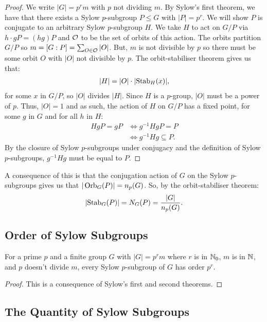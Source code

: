\begin{proof}
    We write $|G| = p^rm$ with $p$ not dividing $m$.
    By Sylow's first theorem, we have that there exists
    a Sylow $p$-subgroup $P \leq G$ with $|P| = p^r$.
    We will show $P$ is conjugate to an arbitrary Sylow
    $p$-subgroup $H$.
    We take $H$ to act on $G / P$ via $h \cdot gP = (hg)P$
    and $\mathcal{O}$ to be the set of orbits of this action.
    The orbits partition $G / P$ so 
    $m = [G : P] = \sum_{O \in \mathcal{O}} |O|$. But, $m$
    is not divisible by $p$ so there must be some orbit
    $O$ with $|O|$ not divisible by $p$.
    The orbit-stabiliser theorem gives us that: \begin{align*}
        |H| = |O| \cdot |\!\operatorname{Stab}_H(x)|,
    \end{align*} for some $x$ in $G / P$, so $|O|$ divides
    $|H|$. Since $H$ is a $p$-group, $|O|$ must be a power
    of $p$. Thus, $|O| = 1$ and as such, the action of $H$ on 
    $G / P$ has a fixed point, for some $g$ in $G$ and for 
    all $h$ in $H$: \begin{align*}
        HgP = gP
        & \Longleftrightarrow g^{-1}HgP = P \\
        & \Longleftrightarrow g^{-1}Hg \subseteq P.
    \end{align*} By the closure of Sylow $p$-subgroups under
    conjugacy and the definition of Sylow $p$-subgroups, 
    $g^{-1}Hg$ must be equal to $P$.
\end{proof}
\noindent
A consequence of this is that the conjugation action of $G$
on the Sylow $p$-subgroups gives us that
$|\operatorname{Orb}_G(P)| = n_p(G)$. So, by the orbit-stabiliser
theorem: \begin{align*}
    |\! \operatorname{Stab}_G(P)| = N_G(P) = \frac{|G|}{n_p(G)}.
\end{align*}

\subsection{Order of Sylow Subgroups}  \label{6.7}

For a prime $p$ and a finite group $G$ with $|G| = p^rm$
where $r$ is in $\mathbb{N}_0$, $m$ is in $\mathbb{N}$, and 
$p$ doesn't divide $m$, every Sylow $p$-subgroup of $G$
has order $p^r$. 
\begin{proof}
    This is a consequence of Sylow's first and second theorems.
\end{proof}

\subsection{The Quantity of Sylow Subgroups} \label{6.8}

